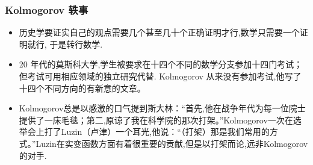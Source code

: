 \documentclass[Prob-All.tex]{subfiles}
\begin{document}
\begin{frame}
  \frametitle{{\rm Kolmogorov} 轶事}
  \begin{itemize}[<+-|alert@+>]
  \item  历史学要证实自己的观点需要几个甚至几十个正确证明才行,数学只需要一个证明就行, 于是转行数学.
  \item 20 年代的莫斯科大学,学生被要求在十四个不同的数学分支参加十四门考试；但考试可用相应领域的独立研究代替. {\rm Kolmogorov} 从来没有参加考试,他写了十四个不同方向的有新意的文章。
  \item {\rm Kolmogorov}总是以感激的口气提到斯大林：“首先,他在战争年代为每一位院士提供了一床毛毯；第二,原谅了我在科学院的那次打架。”{\rm Kolmogorov}一次在选举会上打了{\rm Luzin}（卢津）一个耳光,他说：“（打架）那是我们常用的方式。”{\rm Luzin}在实变函数方面有着很重要的贡献,但是以打架而论,远非{\rm Kolmogorov}的对手.
  \end{itemize}
\end{frame}
\end{document}
